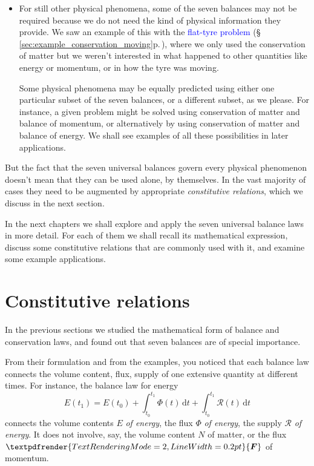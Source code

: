 \documentclass[a4paper,12pt,%
onecolumn,oneside,%
british%
]{memoir}
\renewcommand*{\bm}[1]{\textpdfrender{TextRenderingMode=2,LineWidth=0.2pt}{\boldsymbol{#1}}}
\newcommand*{\di}{\mathrm{d}}%
\renewcommand*{\|}[1][]{\nonscript\:#1\vert\nonscript\:\mathopen{}}
\newcommand*{\sect}{\S}%
\renewcommand*{\autoref}[3][\sect\,\ref]{\textcolor{blue}{#3} {\color{blue}\scriptsize(\faIcon[regular]{eye}\;#1{#2}\;p.\,\pageref{#2})}}
\newcommand*{\yti}{t_{0}}
\newcommand*{\ytf}{t_{1}}
\newcommand*{\dt}{\di t}
\newcommand*{\yN}{N}
\newcommand*{\yE}{E}
\newcommand*{\yH}{\varPhi}%
\newcommand*{\yR}{\mathcal{R}}%
\newcommand*{\yF}{\bm{F}}
\begin{document}
\begin{itemize}[para]
\item For still other physical phenomena, some of the seven balances may not be required because we do not need the kind of physical information they provide. We saw an example of this with the \autoref{sec:example_conservation_moving}{flat-tyre problem}, where we only used the conservation of matter but we weren't interested in what happened to other quantities like energy or momentum, or in how the tyre was moving.

  Some physical phenomena may be equally predicted using either one particular subset of the seven balances, or a different subset, as we please. For instance, a given problem might be solved using conservation of matter and balance of momentum, or alternatively by using conservation of matter and balance of energy. We shall see examples of all these possibilities in later applications.
\end{itemize}

\medskip


But the fact that the seven universal balances govern every physical phenomenon doesn't mean that they can be used alone, by themselves. In the vast majority of cases they need to be augmented by appropriate \emph{constitutive relations}, which we discuss in the next section.

\medskip

In the next chapters we shall explore and apply the seven universal balance laws in more detail. For each of them we shall recall its mathematical expression, discuss some constitutive relations that are commonly used with it, and examine some example applications.


\section{Constitutive relations}
\label{sec:constitutive}

In the previous sections we studied the mathematical form of balance and conservation laws, and found out that seven balances are of special importance.

From their formulation and from the examples, you noticed that each balance law connects the volume content, flux, supply of one extensive quantity at different times. For instance, the balance law for energy
\begin{equation*}
  \yE(\ytf) = \yE(\yti)
  + \int_{\yti}^{\ytf}\!\!\yH(t)\, \dt
  + \int_{\yti}^{\ytf}\!\!\yR(t)\,\dt
\end{equation*}
connects the volume contents $\yE$ \emph{of energy}, the flux $\yH$ \emph{of energy}, the supply $\yR$ \emph{of energy}. It does not involve, say, the volume content $\yN$ of matter, or the flux $\yF$ of momentum.
\end{document}
